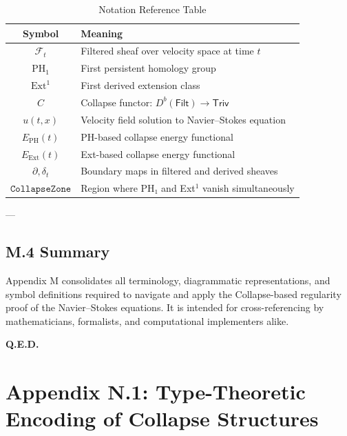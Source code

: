 \documentclass[11pt]{article}
\begin{document}
\begin{table}[h!]
\centering
\begin{tabular}{|c|l|}
\hline
\textbf{Symbol} & \textbf{Meaning} \\
\hline
\( \mathcal{F}_t \) & Filtered sheaf over velocity space at time \( t \) \\
\( \mathrm{PH}_1 \) & First persistent homology group \\
\( \mathrm{Ext}^1 \) & First derived extension class \\
\( C \) & Collapse functor: \( D^b(\mathsf{Filt}) \to \mathsf{Triv} \) \\
\( u(t,x) \) & Velocity field solution to Navier–Stokes equation \\
\( E_{\mathrm{PH}}(t) \) & PH-based collapse energy functional \\
\( E_{\mathrm{Ext}}(t) \) & Ext-based collapse energy functional \\
\( \partial, \delta_t \) & Boundary maps in filtered and derived sheaves \\
\( \texttt{CollapseZone} \) & Region where PH₁ and Ext$^1$ vanish simultaneously \\
\hline
\end{tabular}
\caption{Notation Reference Table}
\end{table}

---

\subsection*{M.4 Summary}

Appendix M consolidates all terminology, diagrammatic representations, and symbol definitions  
required to navigate and apply the Collapse-based regularity proof of the Navier–Stokes equations.  
It is intended for cross-referencing by mathematicians, formalists, and computational implementers alike.

\begin{flushright}
\textbf{Q.E.D.}
\end{flushright}




\section*{Appendix N.1: Type-Theoretic Encoding of Collapse Structures}
\end{document}
